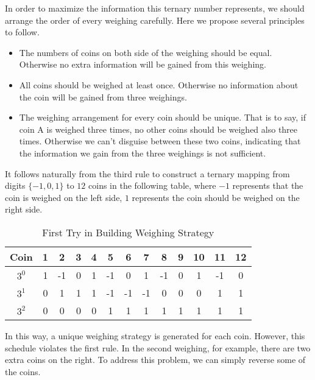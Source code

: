 \begin{exercise}
\begin{solution}
\begin{enumerate}
    In order to maximize the information this ternary number represents, we should arrange the order of every weighing carefully. Here we propose several principles to follow.
    \begin{itemize}
        \item The numbers of coins on both side of the weighing should be equal. Otherwise no extra information will be gained from this weighing. 
        \item All coins should be weighed at least once. Otherwise no information about the coin will be gained from three weighings. 
        \item The weighing arrangement for every coin should be unique. That is to say, if coin A is weighed three times, no other coins should be weighed also three times. Otherwise we can't disguise between these two coins, indicating that the information we gain from the three weighings is not sufficient.
    \end{itemize}
    
    
    It follows naturally from the third rule to construct a ternary mapping from digits $\{-1,0,1\}$ to $12$ coins in the following table, where $-1$ represents that the coin is weighed on the left side, $1$ represents the coin should be weighed on the right side.
    
    \begin{table}[H]
        \begin{center}
        \begin{tabular}{ccccccccccccc}
        \hline
        Coin  & 1 & 2  & 3 & 4 & 5  & 6  & 7  & 8  & 9 & 10 & 11 & 12 \\ \hline
        $3^0$ & 1 & -1 & 0 & 1 & -1 & 0  & 1  & -1 & 0 & 1  & -1 & 0  \\
        $3^1$ & 0 & 1  & 1 & 1 & -1 & -1 & -1 & 0  & 0 & 0  & 1  & 1  \\
        $3^2$ & 0 & 0  & 0 & 0 & 1  & 1  & 1  & 1  & 1 & 1  & 1  & 1  \\ \hline
        \end{tabular}
        \end{center}
        \caption{First Try in Building Weighing Strategy}
    \end{table}

    In this way, a unique weighing strategy is generated for each coin. However, this schedule violates the first rule. In the second weighing, for example, there are two extra coins on the right. To address this problem, we can simply reverse some of the coins. 
    

\end{enumerate}
\end{solution}
\end{exercise}
